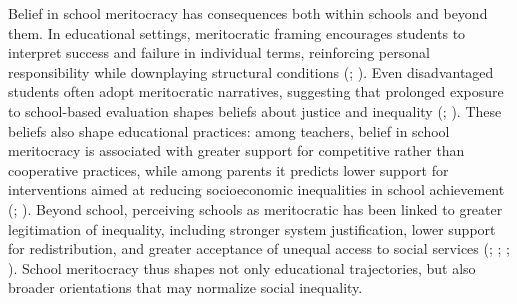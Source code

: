 \documentclass[
  13pt,
]{article}
\begin{document}
Belief in school meritocracy has consequences both within schools and
beyond them. In educational settings, meritocratic framing encourages
students to interpret success and failure in individual terms,
reinforcing personal responsibility while downplaying structural
conditions (;
). Even
disadvantaged students often adopt meritocratic narratives, suggesting
that prolonged exposure to school-based evaluation shapes beliefs about
justice and inequality (; ).
These beliefs also shape educational practices: among teachers, belief
in school meritocracy is associated with greater support for competitive
rather than cooperative practices, while among parents it predicts lower
support for interventions aimed at reducing socioeconomic inequalities
in school achievement (; ). Beyond school, perceiving schools as meritocratic has been
linked to greater legitimation of inequality, including stronger system
justification, lower support for redistribution, and greater acceptance
of unequal access to social services
(;
;
;
). School
meritocracy thus shapes not only educational trajectories, but also
broader orientations that may normalize social inequality.
\end{document}
